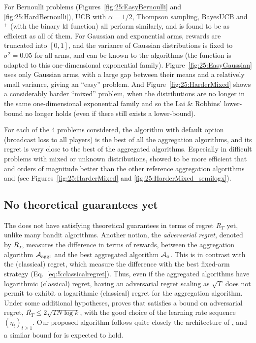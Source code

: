 For Bernoulli problems (Figures~\ref{fig:25:EasyBernoulli} and \ref{fig:25:HardBernoulli}), UCB with $\alpha=1/2$, Thompson sampling, BayesUCB and \klUCB{}$^+$ (with the binary $\mathrm{kl}$ function) all perform similarly, and \Aggr{} is found to be as efficient as all of them.
For Gaussian and exponential arms, rewards are truncated into $[0,1]$, and the variance of Gaussian distributions is fixed to $\sigma^2 = 0.05$ for all arms, and can be known to the algorithms (the \kl{} function is adapted to this one-dimensional exponential family).
%
Figure~\ref{fig:25:EasyGaussian} uses only Gaussian arms, with a large gap between their means and a relatively small variance, giving an ``easy'' problem.
%
And Figure~\ref{fig:25:HarderMixed} shows a considerably harder ``mixed'' problem, when the distributions are no longer in the same one-dimensional exponential family and so the Lai \& Robbins' lower-bound no longer holds (even if there still exists a lower-bound).

For each of the 4 problems considered, the \Aggr{} algorithm with default option (broadcast loss to all players) is the best of all the aggregation algorithms,
and its regret is very close to the best of the aggregated algorithms.
Especially in difficult problems with mixed or unknown distributions, \Aggr{} showed to be more efficient that \ExpQ{} and orders of magnitude better than the other reference aggregation algorithms \LearnExp{} and \CORRAL{} (see Figures~\ref{fig:25:HarderMixed} and \ref{fig:25:HarderMixed_semilogx}).


\subsection{No theoretical guarantees yet}\label{sub:25:theory}

The \Aggr{} does not have satisfying theoretical guarantees in terms of regret $R_T$ yet, unlike many bandit algorithms.
%
Another notion, the \emph{adversarial regret}, denoted by $\overline{R_T}$,
measures the difference in terms of rewards,
between the aggregation algorithm $\mathcal{A}_{\mathrm{aggr}}$ and the best aggregated algorithm $\mathcal{A}_a$. This is in contrast with the (classical) regret, which measure the difference with the best fixed-arm strategy (Eq.~\eqref{eq:5:classicalregret}). Thus,  even if the aggregated algorithms have logarithmic (classical) regret, having an adversarial regret scaling as $\sqrt{T}$ does not permit to exhibit a logarithmic (classical) regret for the aggregation algorithm.
%
%
Under some additional hypotheses,
\cite[Theorem 4.2]{Bubeck12} proves that
\ExpQ{} satisfies a bound on adversarial regret, %
$\overline{R_T} \leq 2 \sqrt{T N \log{k}}$,
with the good choice of the learning rate sequence $(\eta_t)_{t \geq 1}$.
Our proposed algorithm follows quite closely the architecture of \ExpQ,
and a similar bound for \Aggr{} is expected to hold.
%

